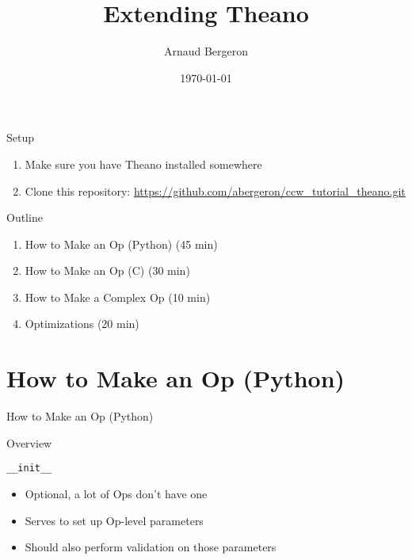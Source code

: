 \documentclass[utf8x]{beamer}
\title{Extending Theano}
\author{Arnaud Bergeron}
\date{\today}
\newcommand{\code}[1]{\lstinline[emph={[2]}]|#1|}
\begin{document}
\frame[plain]{\titlepage}

\section*{}

\begin{frame}{Setup}
\begin{enumerate}
\item Make sure you have Theano installed somewhere
\item Clone this repository: \url{https://github.com/abergeron/ccw_tutorial_theano.git}
\end{enumerate}
\end{frame}

\begin{frame}{Outline}
\begin{enumerate}
\item How to Make an Op (Python) (45 min)
\item How to Make an Op (C) (30 min)
\item How to Make a Complex Op (10 min)
\item Optimizations (20 min)
\end{enumerate}
\end{frame}

\section{How to Make an Op (Python)}

\begin{frame}[plain]{}
\begin{center}
\Huge How to Make an Op (Python)
\end{center}
\end{frame}

\begin{frame}[fragile]{Overview}

\end{frame}

\begin{frame}{\code{__init__}}

\begin{itemize}
\item Optional, a lot of Ops don't have one
\item Serves to set up Op-level parameters
\item Should also perform validation on those parameters
\end{itemize}
\end{frame}
\end{document}
